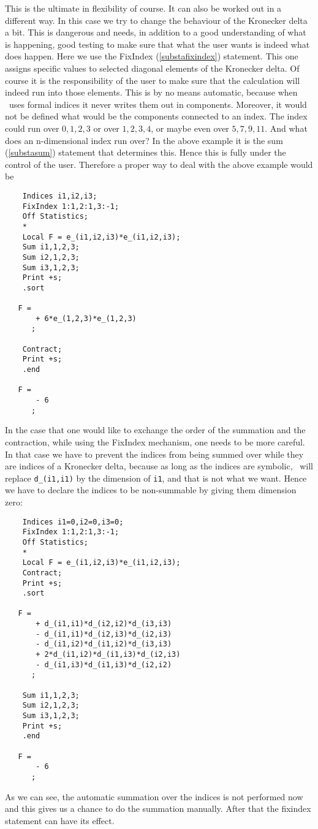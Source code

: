 This is the ultimate in flexibility of course. It can 
also be worked out in a different way. In this case we try to change the 
behaviour of the Kronecker delta a 
bit. This is dangerous and needs, in addition to a good 
understanding of what is happening, good testing to make sure that what the 
user wants is indeed what does happen. Here we use the 
FixIndex (\ref{substafixindex}) statement. This one assigns 
specific values to selected diagonal elements of the Kronecker delta. Of 
course it is the responsibility of the user to make sure that the 
calculation will indeed run into those elements. This is by no means 
automatic, because when \FORM\ uses formal indices it never writes them out 
in components. Moreover, it would not be defined what would be the 
components connected to an index. The index could run over $0,1,2,3$ or 
over $1,2,3,4$, or maybe even over $5,7,9,11$. And what does an 
n-dimensional index run over? In the above example it is the sum 
(\ref{substasum}) statement that determines this. Hence this is fully under 
the control of the user. Therefore a proper way to deal with the above 
example would be
\begin{verbatim}
    Indices i1,i2,i3;
    FixIndex 1:1,2:1,3:-1;
    Off Statistics;
    *
    Local F = e_(i1,i2,i3)*e_(i1,i2,i3);
    Sum i1,1,2,3;
    Sum i2,1,2,3;
    Sum i3,1,2,3;
    Print +s;
    .sort

   F =
       + 6*e_(1,2,3)*e_(1,2,3)
      ;

    Contract;
    Print +s;
    .end

   F =
       - 6
      ;
\end{verbatim}
In the case that one would like to exchange the order of the summation and 
the contraction, while using the FixIndex mechanism, one needs to be more 
careful. In that case we have to prevent the indices from being summed over 
while they are indices of a Kronecker delta, because as long as the indices 
are symbolic, \FORM\ will replace \verb:d_(i1,i1): by the dimension of 
\verb:i1:, and that is not what we want. Hence we have to declare the 
indices to be non-summable by giving them dimension zero:
\begin{verbatim}
    Indices i1=0,i2=0,i3=0;
    FixIndex 1:1,2:1,3:-1;
    Off Statistics;
    *
    Local F = e_(i1,i2,i3)*e_(i1,i2,i3);
    Contract;
    Print +s;
    .sort

   F =
       + d_(i1,i1)*d_(i2,i2)*d_(i3,i3)
       - d_(i1,i1)*d_(i2,i3)*d_(i2,i3)
       - d_(i1,i2)*d_(i1,i2)*d_(i3,i3)
       + 2*d_(i1,i2)*d_(i1,i3)*d_(i2,i3)
       - d_(i1,i3)*d_(i1,i3)*d_(i2,i2)
      ;

    Sum i1,1,2,3;
    Sum i2,1,2,3;
    Sum i3,1,2,3;
    Print +s;
    .end

   F =
       - 6
      ;
\end{verbatim}
As we can see, the automatic summation over the indices is not performed 
now and this gives us a chance to do the summation manually. After that the 
fixindex statement can have its effect. \hfill \vspace{2mm}

